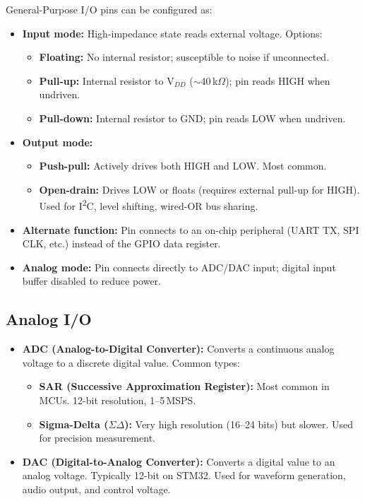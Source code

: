 General-Purpose I/O pins can be configured as:
\begin{itemize}
  \item \textbf{Input mode:} High-impedance state reads external voltage. Options:
    \begin{itemize}[nosep]
      \item \textbf{Floating:} No internal resistor; susceptible to noise if unconnected.
      \item \textbf{Pull-up:} Internal resistor to V$_{DD}$ ($\sim$40\,k$\Omega$); pin reads HIGH when undriven.
      \item \textbf{Pull-down:} Internal resistor to GND; pin reads LOW when undriven.
    \end{itemize}
  \item \textbf{Output mode:}
    \begin{itemize}[nosep]
      \item \textbf{Push-pull:} Actively drives both HIGH and LOW. Most common.
      \item \textbf{Open-drain:} Drives LOW or floats (requires external pull-up for HIGH). Used for I\textsuperscript{2}C, level shifting, wired-OR bus sharing.
    \end{itemize}
  \item \textbf{Alternate function:} Pin connects to an on-chip peripheral (UART TX, SPI CLK, etc.) instead of the GPIO data register.
  \item \textbf{Analog mode:} Pin connects directly to ADC/DAC input; digital input buffer disabled to reduce power.
\end{itemize}

\subsection{Analog I/O}

\begin{itemize}
  \item \textbf{ADC (Analog-to-Digital Converter):} Converts a continuous analog voltage to a discrete digital value. Common types:
    \begin{itemize}[nosep]
      \item \textbf{SAR (Successive Approximation Register):} Most common in MCUs. 12-bit resolution, 1--5\,MSPS.
      \item \textbf{Sigma-Delta ($\Sigma\Delta$):} Very high resolution (16--24 bits) but slower. Used for precision measurement.
    \end{itemize}
  \item \textbf{DAC (Digital-to-Analog Converter):} Converts a digital value to an analog voltage. Typically 12-bit on STM32. Used for waveform generation, audio output, and control voltage.
\end{itemize}

